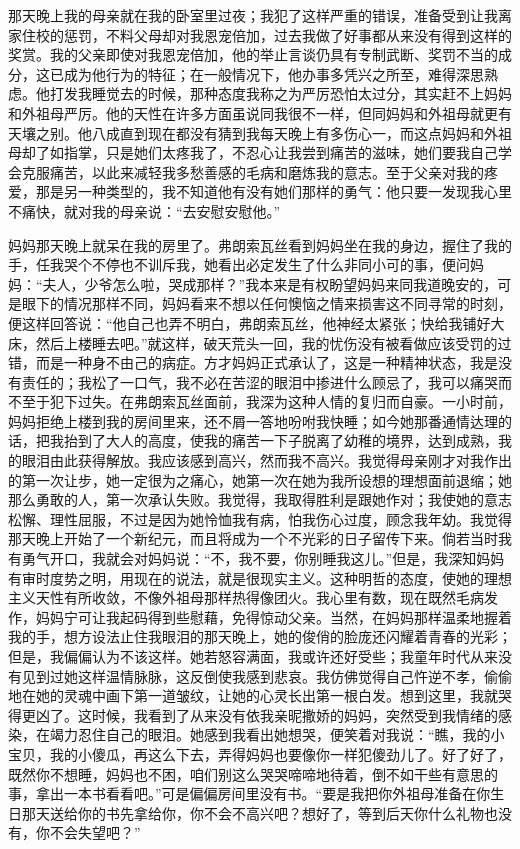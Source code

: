 \par 那天晚上我的母亲就在我的卧室里过夜；我犯了这样严重的错误，准备受到让我离家住校的惩罚，不料父母却对我恩宠倍加，过去我做了好事都从来没有得到这样的奖赏。我的父亲即使对我恩宠倍加，他的举止言谈仍具有专制武断、奖罚不当的成分，这已成为他行为的特征；在一般情况下，他办事多凭兴之所至，难得深思熟虑。他打发我睡觉去的时候，那种态度我称之为严厉恐怕太过分，其实赶不上妈妈和外祖母严厉。他的天性在许多方面虽说同我很不一样，但同妈妈和外祖母就更有天壤之别。他八成直到现在都没有猜到我每天晚上有多伤心一，而这点妈妈和外祖母却了如指掌，只是她们太疼我了，不忍心让我尝到痛苦的滋味，她们要我自己学会克服痛苦，以此来减轻我多愁善感的毛病和磨炼我的意志。至于父亲对我的疼爱，那是另一种类型的，我不知道他有没有她们那样的勇气：他只要一发现我心里不痛快，就对我的母亲说：“去安慰安慰他。”
\par 妈妈那天晚上就呆在我的房里了。弗朗索瓦丝看到妈妈坐在我的身边，握住了我的手，任我哭个不停也不训斥我，她看出必定发生了什么非同小可的事，便问妈妈：“夫人，少爷怎么啦，哭成那样？”我本来是有权盼望妈妈来同我道晚安的，可是眼下的情况那样不同，妈妈看来不想以任何懊恼之情来损害这不同寻常的时刻，便这样回答说：“他自己也弄不明白，弗朗索瓦丝，他神经太紧张；快给我铺好大床，然后上楼睡去吧。”就这样，破天荒头一回，我的忧伤没有被看做应该受罚的过错，而是一种身不由己的病症。方才妈妈正式承认了，这是一种精神状态，我是没有责任的；我松了一口气，我不必在苦涩的眼泪中掺进什么顾忌了，我可以痛哭而不至于犯下过失。在弗朗索瓦丝面前，我深为这种人情的复归而自豪。一小时前，妈妈拒绝上楼到我的房间里来，还不屑一答地吩咐我快睡；如今她那番通情达理的话，把我抬到了大人的高度，使我的痛苦一下子脱离了幼稚的境界，达到成熟，我的眼泪由此获得解放。我应该感到高兴，然而我不高兴。我觉得母亲刚才对我作出的第一次让步，她一定很为之痛心，她第一次在她为我所设想的理想面前退缩；她那么勇敢的人，第一次承认失败。我觉得，我取得胜利是跟她作对；我使她的意志松懈、理性屈服，不过是因为她怜恤我有病，怕我伤心过度，顾念我年幼。我觉得那天晚上开始了一个新纪元，而且将成为一个不光彩的日子留传下来。倘若当时我有勇气开口，我就会对妈妈说：“不，我不要，你别睡我这儿。”但是，我深知妈妈有审时度势之明，用现在的说法，就是很现实主义。这种明哲的态度，使她的理想主义天性有所收敛，不像外祖母那样热得像团火。我心里有数，现在既然毛病发作，妈妈宁可让我起码得到些慰藉，免得惊动父亲。当然，在妈妈那样温柔地握着我的手，想方设法止住我眼泪的那天晚上，她的俊俏的脸庞还闪耀着青春的光彩；但是，我偏偏认为不该这样。她若怒容满面，我或许还好受些；我童年时代从来没有见到过她这样温情脉脉，这反倒使我感到悲哀。我仿佛觉得自己忤逆不孝，偷偷地在她的灵魂中画下第一道皱纹，让她的心灵长出第一根白发。想到这里，我就哭得更凶了。这时候，我看到了从来没有依我亲昵撒娇的妈妈，突然受到我情绪的感染，在竭力忍住自己的眼泪。她感到我看出她想哭，便笑着对我说：“瞧，我的小宝贝，我的小傻瓜，再这么下去，弄得妈妈也要像你一样犯傻劲儿了。好了好了，既然你不想睡，妈妈也不困，咱们别这么哭哭啼啼地待着，倒不如干些有意思的事，拿出一本书看看吧。”可是偏偏房间里没有书。“要是我把你外祖母准备在你生日那天送给你的书先拿给你，你不会不高兴吧？想好了，等到后天你什么礼物也没有，你不会失望吧？”

